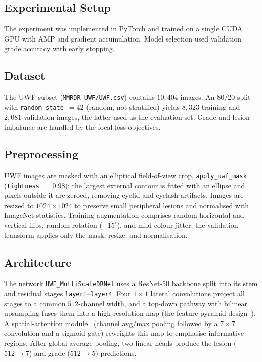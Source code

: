 \documentclass[journal,twoside,web]{ieeecolor}
\begin{document}
\subsection{Experimental Setup}
The experiment was implemented in PyTorch and trained on a single CUDA GPU with
AMP and gradient accumulation. Model selection used validation grade accuracy with
early stopping.

\subsection{Dataset}
The UWF subset (\texttt{MMRDR-UWF/UWF.csv}) contains $10{,}404$ images. An 80/20
split with \texttt{random\_state}~$=42$ (random, not stratified) yields
$8{,}323$ training and $2{,}081$ validation images, the latter used
as the evaluation set. Grade and lesion imbalance are handled by the focal-loss
objectives.

\subsection{Preprocessing}
UWF images are masked with an elliptical field-of-view crop, \texttt{apply\_uwf\_mask}
(\texttt{tightness}~$=0.98$): the largest external contour is fitted with an
ellipse and pixels outside it are zeroed, removing eyelid and eyelash artifacts.
Images are resized to $1024\times1024$ to preserve small peripheral lesions and
normalised with ImageNet statistics. Training augmentation comprises random
horizontal and vertical flips, random rotation ($\pm15^{\circ}$), and mild colour
jitter; the validation transform applies only the mask, resize, and normalisation.

\subsection{Architecture}
The network \texttt{UWF\_MultiScaleDRNet} uses a ResNet-50 backbone split into its
stem and residual stages \texttt{layer1}--\texttt{layer4}. Four $1\times1$ lateral
convolutions project all stages to a common $512$-channel width, and a top-down
pathway with bilinear upsampling fuses them into a high-resolution map (the
feature-pyramid design~\cite{fpn}). A spatial-attention module~\cite{cbam}
(channel avg/max pooling followed by a $7\times7$ convolution and a sigmoid gate)
reweights this map to emphasise informative regions. After global average pooling,
two linear heads produce the lesion ($512\!\rightarrow\!7$) and grade
($512\!\rightarrow\!5$) predictions.
\end{document}
